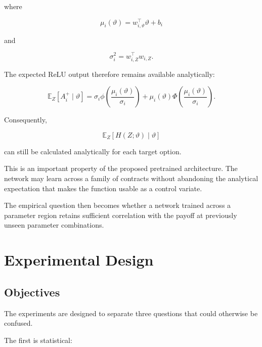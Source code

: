 \documentclass[12pt,a4paper]{report}
\begin{document}
where

\begin{equation}
\mu_i(\vartheta)
=
w_{i,\vartheta}^{\top}\vartheta
+
b_i
\end{equation}

and

\begin{equation}
\sigma_i^2
=
w_{i,Z}^{\top}w_{i,Z}.
\end{equation}

The expected ReLU output therefore remains available analytically:

\begin{equation}
\mathbb{E}_Z
\left[
A_i^+
\mid
\vartheta
\right]
=
\sigma_i
\phi
\left(
\frac{
\mu_i(\vartheta)
}{
\sigma_i
}
\right)
+
\mu_i(\vartheta)
\Phi
\left(
\frac{
\mu_i(\vartheta)
}{
\sigma_i
}
\right).
\end{equation}

Consequently,

\begin{equation}
\mathbb{E}_Z
\left[
H(Z;\vartheta)
\mid
\vartheta
\right]
\end{equation}

can still be calculated analytically for each target option.

This is an important property of the proposed pretrained architecture. The network may learn across a family of contracts without abandoning the analytical expectation that makes the function usable as a control variate.

The empirical question then becomes whether a network trained across a parameter region retains sufficient correlation with the payoff at previously unseen parameter combinations.


\chapter{Experimental Design}

\section{Objectives}

The experiments are designed to separate three questions that could otherwise be confused.

The first is statistical:
\end{document}

